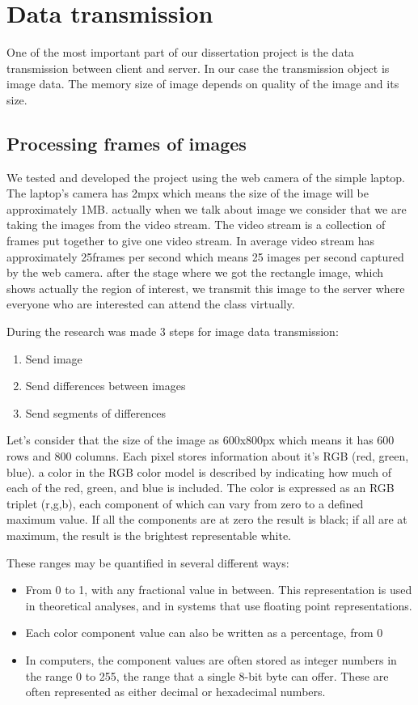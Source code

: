 \chapter{Data transmission}


One of the most important part of our dissertation project is the data transmission between client and server. In our case the transmission object is image data. The memory size of image depends on quality of the image and its size. 

\section{Processing frames of images}
We tested and developed the project using the web camera of the simple laptop. The laptop’s camera has 2mpx which means the size of the image will be approximately 1MB. actually when we talk about image we consider that we are taking the images from the video stream. The video stream is a collection of frames put together to give one video stream. In average video stream has approximately 25frames per second which means 25 images per second captured by the web camera. after the stage where we got the rectangle image, which shows actually the region of interest, we transmit this image to the server where everyone who are interested can attend the class virtually.

During the research was made 3 steps for image data transmission:
\begin{enumerate}
    \item Send image
    \item Send differences between images
    \item Send segments of differences
\end{enumerate}

Let’s consider that the size of the image as 600x800px which means it has 600 rows and 800 columns. Each pixel stores information about it’s RGB (red, green, blue). a color in the RGB color model is described by indicating how much of each of the red, green, and blue is included. The color is expressed as an RGB triplet (r,g,b), each component of which can vary from zero to a defined maximum value. If all the components are at zero the result is black; if all are at maximum, the result is the brightest representable white.

These ranges may be quantified in several different ways:
\begin{itemize}
    \item From 0 to 1, with any fractional value in between. This representation is used in theoretical analyses, and in systems that use floating point representations.
    \item Each color component value can also be written as a percentage, from 0%
    \item In computers, the component values are often stored as integer numbers in the range 0 to 255, the range that a single 8-bit byte can offer. These are often represented as either decimal or hexadecimal numbers.
\end{itemize}


